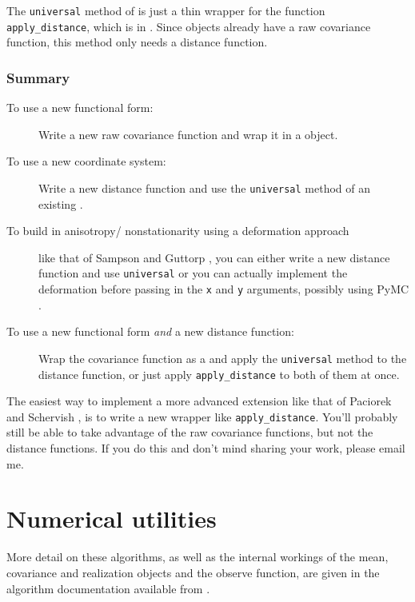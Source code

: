\documentclass{manual}
\begin{document}
The \texttt{universal} method of  is just a thin wrapper for the function \texttt{apply_distance}, which is in . Since  objects already have a raw covariance function, this method only needs a distance function. 

\subsection{Summary}\label{sec:cookbook}
\begin{description}
    \item[To use a new functional form:] Write a new raw covariance function and wrap it in a  object.
    \item[To use a new coordinate system:] Write a new distance function and use the \texttt{universal} method of an existing .
    \item[To build in anisotropy/ nonstationarity using a deformation approach] like that of Sampson and Guttorp \cite{sampson}, you can either write a new distance function and use \texttt{universal} or you can actually implement the deformation before passing in the \texttt{x} and \texttt{y} arguments, possibly using PyMC .
    \item[To use a new functional form \emph{and} a new distance function:] Wrap the covariance function as a  and apply the \texttt{universal} method to the distance function, or just apply \texttt{apply_distance} to both of them at once.
\end{description}

The easiest way to implement a more advanced extension like that of Paciorek and Schervish \cite{pachische} , is to write a new wrapper like \texttt{apply_distance}. You'll probably still be able to take advantage of the raw covariance functions, but not the distance functions. If you do this and don't mind sharing your work, please email me.



\chapter{Numerical utilities}\label{cha:numerics} %

More detail on these algorithms, as well as the internal workings of the mean, covariance and realization objects and the observe function, are given in the algorithm documentation available from .
\end{document}
